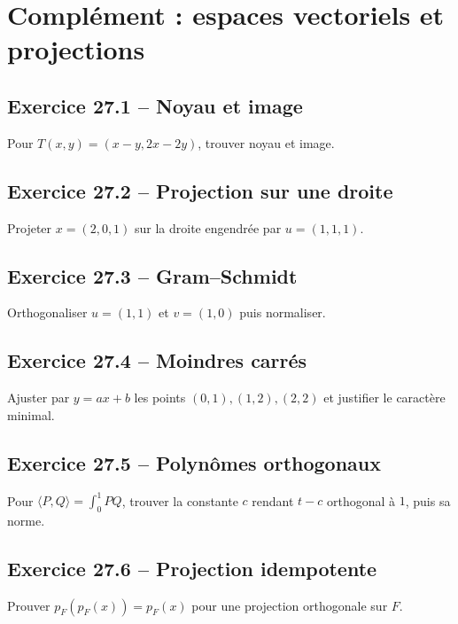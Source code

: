 \chapter{Complément : espaces vectoriels et projections}
\section*{Exercice 27.1 -- Noyau et image}
Pour $T(x,y)=(x-y,2x-2y)$, trouver noyau et image.

\section*{Exercice 27.2 -- Projection sur une droite}
Projeter $x=(2,0,1)$ sur la droite engendrée par $u=(1,1,1)$.

\section*{Exercice 27.3 -- Gram--Schmidt}
Orthogonaliser $u=(1,1)$ et $v=(1,0)$ puis normaliser.

\section*{Exercice 27.4 -- Moindres carrés}
Ajuster par $y=ax+b$ les points $(0,1),(1,2),(2,2)$ et justifier le caractère minimal.

\section*{Exercice 27.5 -- Polynômes orthogonaux}
Pour $\langle P,Q\rangle=\int_0^1PQ$, trouver la constante $c$ rendant $t-c$ orthogonal à $1$, puis sa norme.

\section*{Exercice 27.6 -- Projection idempotente}
Prouver $p_F(p_F(x))=p_F(x)$ pour une projection orthogonale sur $F$.
